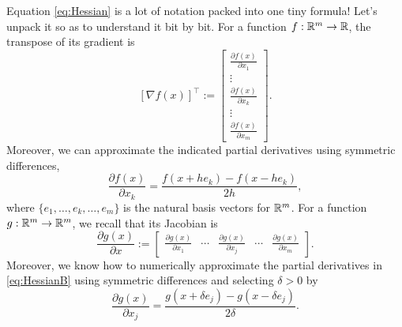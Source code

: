 Equation \eqref{eq:Hessian} is a lot of notation packed into one tiny formula! Let's unpack it so as to understand it bit by bit. For a function $f: \mathbb R^m \to \mathbb R$, the transpose of its gradient is
\begin{equation}
\label{eq:OptimizatinGradient}
        \left[ \nabla f(x) \right]^\top :=  \left[\begin{array}{c}
      \frac{\partial f(x)}{\partial x_1} \\  \vdots \\ \frac{\partial f(x)}{\partial x_k} \\ \vdots \\ \frac{\partial f(x)}{\partial x_m}
    \end{array} \right].
\end{equation}
Moreover, we can approximate the indicated partial derivatives using symmetric differences,
\begin{equation}
    \label{eq:VectorPartialDerivative}
    \frac{\partial f(x)}{\partial x_k} = \frac{f(x+h e_k)-f(x-h e_k)}{2h},
    \end{equation}
where $\{e_1, \ldots,  e_k, \ldots, e_m \}$ is the natural basis vectors for $\mathbb R^m$.
For a function $g: \mathbb R^m \to \mathbb R^m$, we recall that its Jacobian is
\begin{equation}
    \label{eq:HessianB}
       \frac{\partial g(x)}{\partial x}:=  \left[\begin{array}{ccccc}
      \frac{\partial g(x)}{\partial x_1} &  \cdots & \frac{\partial g(x)}{\partial x_j} & \cdots & \frac{\partial g(x)}{\partial x_m}
    \end{array} \right].
\end{equation}
Moreover, we know how to numerically approximate the partial derivatives in \eqref{eq:HessianB} using symmetric differences and selecting $\delta >0$ by
\begin{equation}
    \label{eq:VectorPartialDerivative2}
    \frac{\partial g(x)}{\partial x_j} = \frac{g(x+\delta e_j)-g(x-\delta e_j)}{2 \delta}.
    \end{equation}\\
    
